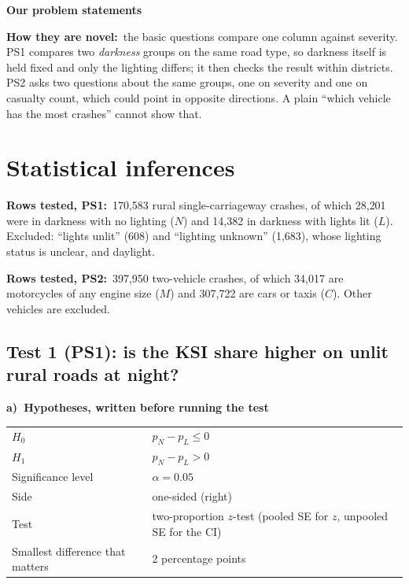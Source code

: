 \documentclass[10pt,a4paper,twocolumn]{article}
\newcommand{\field}[2]{\textbf{#1}~#2\par}
\newcommand{\tpart}[2]{\par\needspace{12\baselineskip}\smallskip\textbf{#1)~#2}\par}
\newcommand{\minihead}[1]{\par\needspace{8\baselineskip}\smallskip\textbf{#1}\par}
\begin{document}
\minihead{Our problem statements}

\noindent{}

\field{How they are novel:}{the basic questions compare one column against severity. PS1
compares two \emph{darkness} groups on the same road type, so darkness itself is held fixed and
only the lighting differs; it then checks the result within districts. PS2 asks two questions
about the same groups, one on severity and one on casualty count, which could point in opposite
directions. A plain ``which vehicle has the most crashes'' cannot show that.}

\section{Statistical inferences}

\field{Rows tested, PS1:}{170{,}583 rural single-carriageway crashes, of which 28{,}201 were in
darkness with no lighting ($N$) and 14{,}382 in darkness with lights lit ($L$). Excluded:
``lights unlit'' (608) and ``lighting unknown'' (1{,}683), whose lighting status is unclear,
and daylight.}

\field{Rows tested, PS2:}{397{,}950 two-vehicle crashes, of which 34{,}017 are motorcycles of
any engine size ($M$) and 307{,}722 are cars or taxis ($C$). Other vehicles are excluded.}

\subsection*{Test 1 (PS1): is the KSI share higher on unlit rural roads at night?}

\tpart{a}{Hypotheses, written before running the test}
{\small
\begin{tabularx}{\linewidth}{@{}K{3.4cm} Y@{}}
\toprule
$H_0$ & $p_N-p_L\le0$ \\
$H_1$ & $p_N-p_L>0$ \\
Significance level & $\alpha=0.05$ \\
Side & one-sided (right) \\
Test & two-proportion $z$-test (pooled SE for $z$, unpooled SE for the CI) \\
Smallest difference that matters & 2 percentage points \\
\bottomrule
\end{tabularx}}
\end{document}
